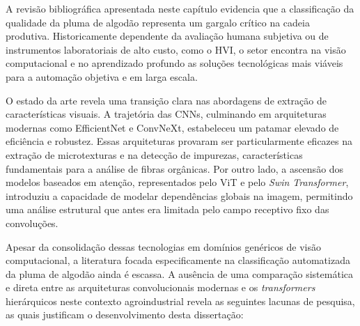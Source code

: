 
A revisão bibliográfica apresentada neste capítulo evidencia que a classificação da qualidade da pluma de algodão representa um gargalo crítico na cadeia produtiva. Historicamente dependente da avaliação humana subjetiva ou de instrumentos laboratoriais de alto custo, como o HVI, o setor encontra na visão computacional e no aprendizado profundo as soluções tecnológicas mais viáveis para a automação objetiva e em larga escala.

O estado da arte revela uma transição clara nas abordagens de extração de características visuais. A trajetória das CNNs, culminando em arquiteturas modernas como EfficientNet e ConvNeXt, estabeleceu um patamar elevado de eficiência e robustez. Essas arquiteturas provaram ser particularmente eficazes na extração de microtexturas e na detecção de impurezas, características fundamentais para a análise de fibras orgânicas. Por outro lado, a ascensão dos modelos baseados em atenção, representados pelo ViT e pelo \textit{Swin Transformer}, introduziu a capacidade de modelar dependências globais na imagem, permitindo uma análise estrutural que antes era limitada pelo campo receptivo fixo das convoluções. 

Apesar da consolidação dessas tecnologias em domínios genéricos de visão computacional, a literatura focada especificamente na classificação automatizada da pluma de algodão ainda é escassa. A ausência de uma comparação sistemática e direta entre as arquiteturas convolucionais modernas e os \textit{transformers} hierárquicos neste contexto agroindustrial revela as seguintes lacunas de pesquisa, as quais justificam o desenvolvimento desta dissertação:

